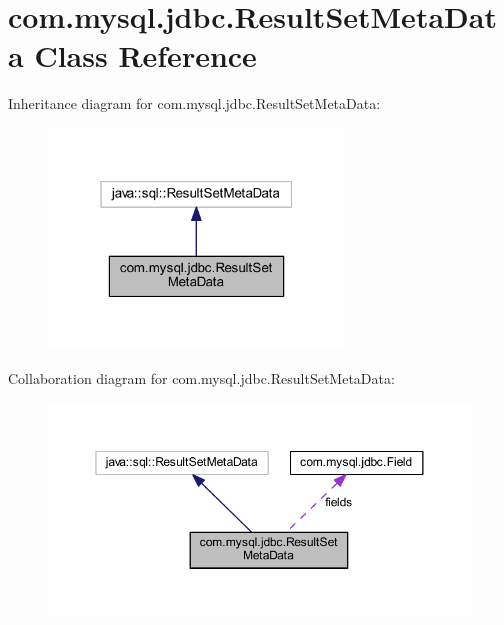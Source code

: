 \hypertarget{classcom_1_1mysql_1_1jdbc_1_1_result_set_meta_data}{}\section{com.\+mysql.\+jdbc.\+Result\+Set\+Meta\+Data Class Reference}
\label{classcom_1_1mysql_1_1jdbc_1_1_result_set_meta_data}


Inheritance diagram for com.\+mysql.\+jdbc.\+Result\+Set\+Meta\+Data\+:
\nopagebreak
\begin{figure}[H]
\begin{center}
\leavevmode
\includegraphics[width=223pt]{classcom_1_1mysql_1_1jdbc_1_1_result_set_meta_data__inherit__graph}
\end{center}
\end{figure}


Collaboration diagram for com.\+mysql.\+jdbc.\+Result\+Set\+Meta\+Data\+:
\nopagebreak
\begin{figure}[H]
\begin{center}
\leavevmode
\includegraphics[width=350pt]{classcom_1_1mysql_1_1jdbc_1_1_result_set_meta_data__coll__graph}
\end{center}
\end{figure}
